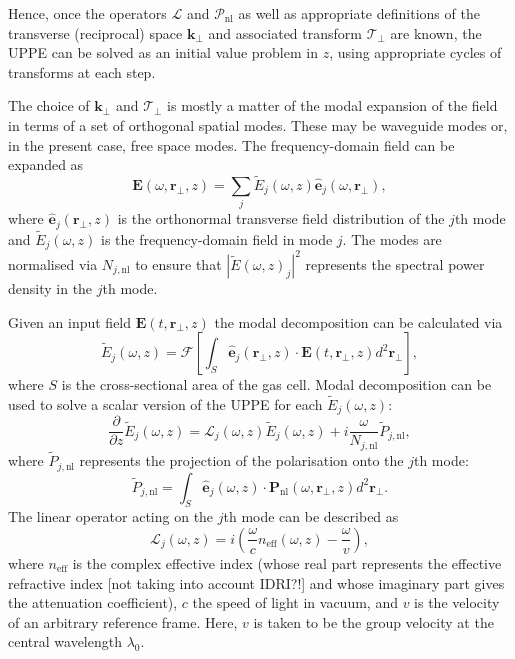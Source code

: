 \documentclass[a4paper]{jpconf}
\begin{document}
Hence, once the operators $\mathcal{L}$ and $\mathcal{P}_\text{nl}$ as well as appropriate definitions of the transverse (reciprocal) space $\mathbf{k}_\perp$ and associated transform $\mathcal{T}_\perp$ are known, the UPPE can be solved as an initial value problem in $z$, using appropriate cycles of transforms at each step. \par 
The choice of $\mathbf{k}_\perp$ and $\mathcal{T}_\perp$ is mostly a matter of the modal expansion of the field in terms of a set of orthogonal spatial modes. These may be waveguide modes or, in the present case, free space modes. The frequency-domain field can be expanded as 
\begin{equation}
\mathbf{E}(\omega, \mathbf{r}_\perp, z) = \sum_j \tilde{E}_j (\omega,z)  \hat{\mathbf{e}}_j (\omega, \mathbf{r}_\perp),
\end{equation}
where $\hat{\mathbf{e}}_j (\mathbf{r}_\perp, z)$ is the orthonormal transverse field distribution of the $j$th mode and $\tilde{E}_j (\omega,z)$ is the frequency-domain field in mode $j$. The modes are normalised via $N_{j, \text{nl}}$ to ensure that $|\tilde{E}(\omega,z)_j|^2$ represents the spectral power density in the $j$th mode. \par 
Given an input field $\mathbf{E}(t, \mathbf{r}_\perp, z)$ the modal decomposition can be calculated via 
\begin{equation}
\tilde{E}_j (\omega,z) = \mathcal{F}\left[ \int_S \hat{\mathbf{e}}_j(\mathbf{r}_\perp,z) \cdot \mathbf{E}(t, \mathbf{r}_\perp, z) d^2 \mathbf{r}_\perp \right],
\end{equation}
where $S$ is the cross-sectional area of the gas cell. Modal decomposition can be used to solve  a scalar version of the UPPE for each $\tilde{E}_j(\omega,z)$:
\begin{equation}
\frac{\partial}{\partial z} \tilde{E}_j(\omega,z) = \mathcal{L}_j (\omega,z) \tilde{E}_j(\omega,z)+ i\frac{\omega}{N_{j, \text{nl}}} \tilde{P}_{j,\text{nl}},
\end{equation}
where $\tilde{P}_{j,\text{nl}}$ represents the projection of the polarisation onto the $j$th mode:
\begin{equation}
\tilde{P}_{j, \text{nl}} = \int_S \hat{\mathbf{e}}_j(\omega,z) \cdot \mathbf{P}_{\text{nl}}(\omega, \mathbf{r}_\perp, z) d^2 \mathbf{r}_\perp.
\end{equation}
The linear operator acting on the $j$th mode can be described as 
\begin{equation}
\mathcal{L}_j(\omega, z) = i \left( \frac{\omega}{c} n_{\text{eff}}(\omega,z) - \frac{\omega}{v} \right),
\end{equation}
where $n_\text{eff}$ is the complex effective index (whose real part represents the effective refractive index [not taking into account IDRI?!] and whose imaginary part gives the attenuation coefficient), $c$ the speed of light in vacuum, and $v$ is the velocity of an arbitrary reference frame. Here, $v$ is taken to be the group velocity at the central wavelength $\lambda_0$. \par 
\end{document}
